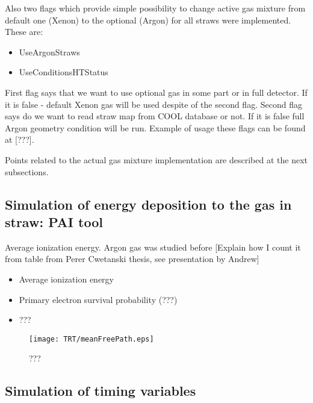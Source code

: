 Also two flags which provide simple possibility to change active gas mixture from default one (Xenon) to the optional (Argon) for all straws were implemented. These are:
\begin{itemize}
 \item UseArgonStraws
 \item UseConditionsHTStatus
\end{itemize}

First flag says that we want to use optional gas in some part or in full detector. If it is false - default Xenon gas will be used despite of the second flag. 
Second flag says do we want to read straw map from COOL database or not.
If it is false full Argon geometry condition will be run. Example of usage these flags can be found at [???].

Points related to the actual gas mixture implementation are described at the next subsections.

\subsection{Simulation of energy deposition to the gas in straw: PAI tool}


Average ionization energy. Argon gas was studied before   [Explain how I count it from table from Perer Cwetanski thesis, see presentation by Andrew]




\begin{itemize}
 \item Average ionization energy
 \item Primary electron survival probability (???)
 \item ???
\end{itemize}



\begin{figure}[h]
\begin{center}
 \texttt{[image: TRT/meanFreePath.eps]}
\caption{\label{fig:meanFreePath} ???}
\end{center}
\end{figure}


\subsection{Simulation of timing variables}

